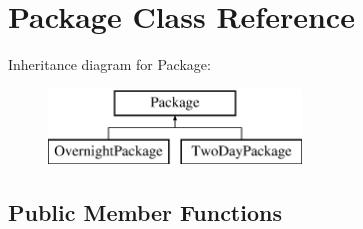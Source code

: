 \hypertarget{class_package}{}\section{Package Class Reference}
\label{class_package}
Inheritance diagram for Package\+:\begin{figure}[H]
\begin{center}
\leavevmode
\includegraphics[height=2.000000cm]{class_package}
\end{center}
\end{figure}
\subsection*{Public Member Functions}
